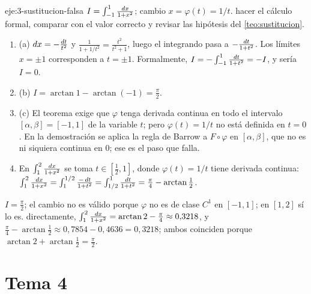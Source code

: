 \begin{solucion}{eje:3-sustitucion-falsa}
\datos $I=\int_{-1}^{1}\frac{\mathop{}\!d x}{1+x^{2}}$; cambio $x=\varphi(t)=1/t$.
\planteamiento hacer el cálculo formal, comparar con el valor correcto y revisar las hipótesis del \cref{teo:sustitucion}.
\pasos
\begin{enumerate}[label=\arabic*.]
  \item (a) $\mathop{}\!d x=-\frac{\mathop{}\!d t}{t^{2}}$ y $\frac{1}{1+1/t^{2}}=\frac{t^{2}}{t^{2}+1}$, luego el integrando pasa a $-\frac{\mathop{}\!d t}{1+t^{2}}$. Los límites $x=\pm1$ corresponden a $t=\pm1$. Formalmente, $I=-\int_{-1}^{1}\frac{\mathop{}\!d t}{1+t^{2}}=-I$, y sería $I=0$.
  \item (b) $I=\arctan1-\arctan(-1)=\frac\pi2$.
  \item (c) El teorema exige que $\varphi$ tenga derivada continua en todo el intervalo $[\alpha,\beta]=[-1,1]$ de la variable $t$; pero $\varphi(t)=1/t$ no está definida en $t=0$. En la demostración se aplica la regla de Barrow a $F\circ\varphi$ en $[\alpha,\beta]$, que no es ni siquiera continua en $0$; ese es el paso que falla.
  \item En $\int_1^{2}\frac{\mathop{}\!d x}{1+x^{2}}$ se toma $t\in[\frac12,1]$, donde $\varphi(t)=1/t$ tiene derivada continua: $\int_1^{2}\frac{\mathop{}\!d x}{1+x^{2}}=\int_1^{1/2}\frac{-\mathop{}\!d t}{1+t^{2}}=\int_{1/2}^{1}\frac{\mathop{}\!d t}{1+t^{2}}=\frac\pi4-\arctan\frac12$.
\end{enumerate}
\resultado $I=\frac\pi2$; el cambio no es válido porque $\varphi$ no es de clase $C^{1}$ en $[-1,1]$; en $[1,2]$ sí lo es.
\comprobacion directamente, $\int_1^{2}\frac{\mathop{}\!d x}{1+x^{2}}=\arctan2-\frac\pi4\approx0{,}3218$, y $\frac\pi4-\arctan\frac12\approx0{,}7854-0{,}4636=0{,}3218$; ambos coinciden porque $\arctan2+\arctan\frac12=\frac\pi2$.
\end{solucion}

\section{Tema 4}

